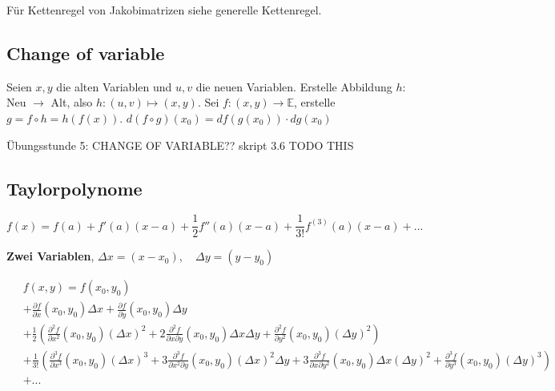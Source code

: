 Für Kettenregel von Jakobimatrizen siehe generelle Kettenregel.

\subsection{Change of variable}

Seien $x, y$ die alten Variablen und $u, v$ die neuen Variablen. Erstelle Abbildung $h:$ Neu $\to$ Alt, also $h: (u, v) \mapsto (x, y)$. Sei $f: (x, y) \to \mathbb{E}$, erstelle $g = f \circ h = h(f(x))$. $d (f \circ g) (x_0) = df(g(x_0)) \cdot dg(x_0)$

Übungsstunde 5: CHANGE OF VARIABLE?? skript 3.6 TODO THIS


\subsection{Taylorpolynome}

\[
    f(x) = f(a) + f'(a)(x-a) + \frac{1}{2} f''(a)(x-a) + \frac{1}{3!} f^{(3)}(a)(x-a) + ...
\]

\textbf{Zwei Variablen}, $\Delta x = (x - x_0)$, ~ $\Delta y = (y - y_0)$

\begin{align*}
    \; & f(x, y) =f(x_0, y_0)\\ &+ \frac{\partial f}{\partial x}(x_0,y_0) \Delta x + \frac{\partial f}{\partial y}(x_0,y_0) \Delta y\\
    &+ \frac{1}{2} \left(\frac{\partial^2 f}{\partial x^2}(x_0,y_0) (\Delta x)^2 + 2\frac{\partial^2 f}{\partial x \partial y}(x_0,y_0) \Delta x \Delta y + \frac{\partial^2 f}{\partial y^2}(x_0,y_0) (\Delta y)^2\right)\\
    &+ \frac{1}{3!} \left(\frac{\partial^3 f}{\partial x^3}(x_0,y_0) (\Delta x)^3 + 3\frac{\partial^3 f}{\partial x^2 \partial y}(x_0,y_0) (\Delta x)^2 \Delta y + 3\frac{\partial^3 f}{\partial x \partial y^2}(x_0,y_0) \Delta x (\Delta y)^2 + \frac{\partial^3 f}{\partial y^3}(x_0,y_0) (\Delta y)^3\right)\\
    & + ...
\end{align*}

